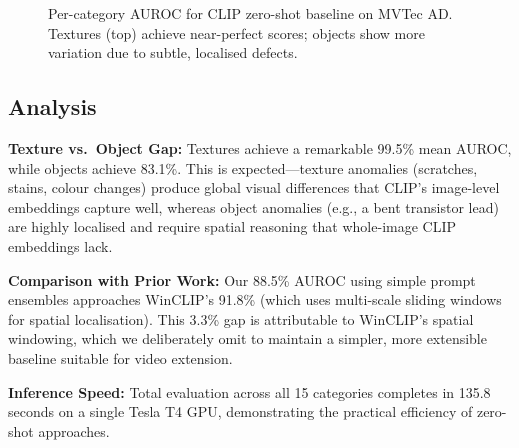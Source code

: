 \begin{figure}[h]
\centering
{}
\caption{Per-category AUROC for CLIP zero-shot baseline on MVTec AD. Textures (top) achieve near-perfect scores; objects show more variation due to subtle, localised defects.}
\label{fig:auroc_bar}
\end{figure}

\subsection{Analysis}

\textbf{Texture vs.\ Object Gap:} Textures achieve a remarkable 99.5\% mean AUROC, while objects achieve 83.1\%. This is expected---texture anomalies (scratches, stains, colour changes) produce global visual differences that CLIP's image-level embeddings capture well, whereas object anomalies (e.g., a bent transistor lead) are highly localised and require spatial reasoning that whole-image CLIP embeddings lack.

\textbf{Comparison with Prior Work:} Our 88.5\% AUROC using simple prompt ensembles approaches WinCLIP's 91.8\% (which uses multi-scale sliding windows for spatial localisation). This 3.3\% gap is attributable to WinCLIP's spatial windowing, which we deliberately omit to maintain a simpler, more extensible baseline suitable for video extension.

\textbf{Inference Speed:} Total evaluation across all 15 categories completes in 135.8 seconds on a single Tesla T4 GPU, demonstrating the practical efficiency of zero-shot approaches.

